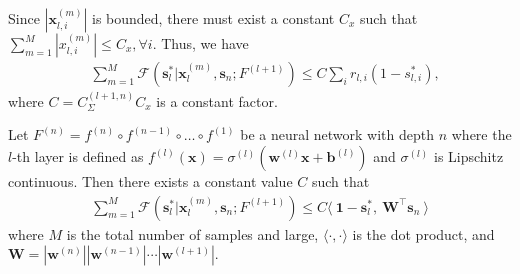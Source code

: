 \documentclass[10pt,twocolumn,letterpaper]{article}
\newtheorem{proposition}[theorem]{Proposition}
\def\mb{\mathbf}
\begin{document}
Since $|\mb x^{(m)}_{l,i}|$ is bounded, there must exist a constant $C_x$ such that $\sum_{m=1}^M |x^{(m)}_{l,i}|\le C_x,\forall i$. Thus, we have
\begin{align}
&\sum_{m=1}^M \mathcal{F}(\mb s^*_l|\mb x^{(m)}_l,\mb s_n; F^{(l+1)})\le C\sum_ir_{l,i}(1-s^*_{l,i}),\label{eq:upbound}
\end{align}
where $C=C_\Sigma^{(l+1,n)}C_x$ is a constant factor.

Let $F^{(n)}=f^{(n)}\circ f^{(n-1)}\circ\dots\circ f^{(1)}$ be a neural network with depth $n$ where the $l$-th layer is defined as $f^{(l)}(\mb x)=\sigma^{(l)}(\mb w^{(l)}\mb x+\mb b^{(l)})$ and $\sigma^{(l)}$ is Lipschitz continuous. Then there exists a constant value $C$ such that
\begin{align}\label{eq:layer}
    \sum_{m=1}^M\mathcal{F}(\mb s^*_l|\mb x^{(m)}_l, \mb s_n; F^{(l+1)})\le C\langle\ \mb 1-\mb s^*_l,\ \mb W^\intercal\mb s_n\ \rangle
\end{align}
where $M$ is the total number of samples and large, $\langle\cdot,\cdot\rangle$ is the dot product, and $\mb W=|\mb w^{(n)}||\mb w^{(n-1)}|\cdots|\mb w^{(l+1)}|$.
\end{document}
